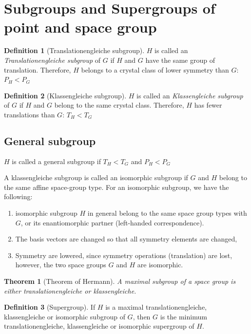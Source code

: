 \documentclass{amsart}
\newtheorem*{theorem}{Theorem}
\theoremstyle{remark}
\theoremstyle{remark}
\theoremstyle{definition}
\newtheorem*{definition}{Definition}
\begin{document}
\vspace{10pt}
\section*{Subgroups and Supergroups of point and space group}
\begin{definition}
    [Translationengleiche subgroup]
    $H$ is called an \emph{Translationengleiche subgroup} of $G$ if $H$ and $G$ have the same group of translation. 
    Therefore, $H$ belongs to a crystal class of lower symmetry than $G$: $P_H < P_G$
\end{definition}

\begin{definition}
    [Klassengleiche subgroup]
    $H$ is called an \emph{Klassengleiche subgroup} of $G$ if $H$ and $G$ belong to the same crystal class. 
    Therefore, $H$ has fewer translations than $G$: $T_H < T_G$
\end{definition}

\subsection*{General subgroup}
$H$ is called a general subgroup if $T_H < T_G$ and $P_H < P_G$

A klassengleiche subgroup is called an isomorphic subgroup if $G$ and $H$ belong to the same affine space-group type. 
For an isomorphic subgroup, we have the following:
\begin{enumerate}
    \item isomorphic subgroup $H$ in general belong to the same space group types with $G$, or its enantiomorphic partner (left-handed correspondence).
    \item The basis vectors are changed so that all symmetry elements are changed,
    \item Symmetry are lowered, since symmetry operations (translation) are lost, however, the two space groups $G$ and $H$ are isomorphic.
\end{enumerate}

\begin{theorem}
    [Theorem of Hermann]
    A maximal subgroup of a space group is either translationengleiche or klassengleiche.
\end{theorem}

\vspace{10pt}

\begin{definition}
    [Supergroup]
    If $H$ is a maximal translationengleiche, klassengleiche or isomorphic subgroup of $G$, then $G$
    is the minimum translationengleiche, klassengleiche or isomorphic supergroup of $H$.
\end{definition}
\end{document}
